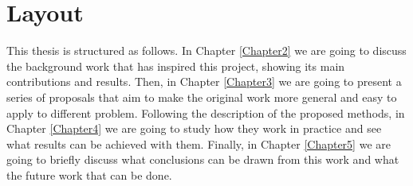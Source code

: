 

\section{Layout}

This thesis is structured as follows. In Chapter \ref{Chapter2} we are going to discuss the
background work that has inspired this project, showing its main contributions and results.
Then, in Chapter \ref{Chapter3} we are going to present a series of proposals that
aim to make the original work more general and easy to apply to different problem. Following
the description of the proposed methods, in Chapter \ref{Chapter4} we are going to study how
they work in practice and see what results can be achieved with them. Finally, in Chapter
\ref{Chapter5} we are going to briefly discuss what conclusions can be drawn from this work
and what the future work that can be done.


